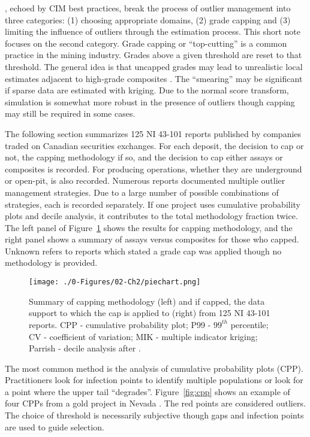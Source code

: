 \cite{leuangthong2015dealing}, echoed by CIM best practices, break the process of outlier management into three categories: (1) choosing appropriate domains, (2) grade capping and (3) limiting the influence of outliers through the estimation process. This short note focuses on the second category. Grade capping or ``top-cutting'' is a common practice in the mining industry. Grades above a given threshold are reset to that threshold. The general idea is that uncapped grades may lead to unrealistic local estimates adjacent to high-grade composites \citep{nowak2013suggestions}. The ``smearing'' may be significant if sparse data are estimated with kriging. Due to the normal score transform, simulation is somewhat more robust in the presence of outliers though capping may still be required in some cases.

The following section summarizes 125 NI 43-101 reports published by companies traded on Canadian securities exchanges. For each deposit, the decision to cap or not, the capping methodology if so, and the decision to cap either assays or composites is recorded. For producing operations, whether they are underground or open-pit, is also recorded. Numerous reports documented multiple outlier management strategies. Due to a large number of possible combinations of strategies, each is recorded separately. If one project uses cumulative probability plots and decile analysis, it contributes to the total methodology fraction twice. The left panel of Figure~\ref{fig:piechart} shows the results for capping methodology, and the right panel shows a summary of assays versus composites for those who capped. Unknown refers to reports which stated a grade cap was applied though no methodology is provided.

\begin{figure}[htb!]
    \centering
    \texttt{[image: ./0-Figures/02-Ch2/piechart.png]}
    \caption{Summary of capping methodology (left) and if capped, the data support to which the cap is applied to (right) from 125 NI 43-101 reports. CPP - cumulative probability plot; P99 - $99^{th}$ percentile; CV - coefficient of variation; MIK - multiple indicator kriging; Parrish - decile analysis after \cite{parrish1997geologist}.}
    \label{fig:piechart}
\end{figure}

The most common method is the analysis of cumulative probability plots (CPP). Practitioners look for infection points to identify multiple populations or look for a point where the upper tail ``degrades''. Figure~\ref{fig:cpp} shows an example of four CPPs from a gold project in Nevada \citep{fiore2021}. The red points are considered outliers. The choice of threshold is necessarily subjective though gaps and infection points are used to guide selection.

